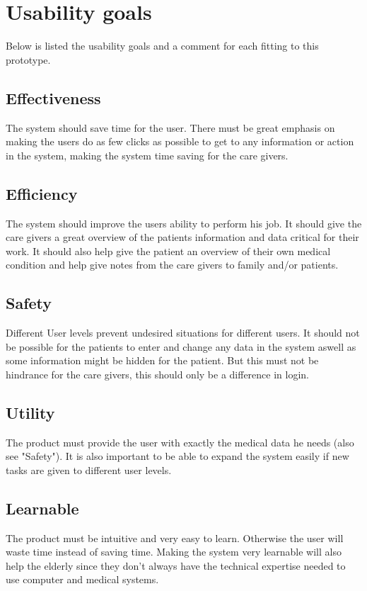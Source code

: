 \section{Usability goals}
Below is listed the usability goals and a comment for each fitting to this prototype.
\subsection{Effectiveness}
The system should save time for the user. There must be great emphasis on making the users do as few clicks as possible to get to any information or action in the system, making the system time saving for the care givers.

\subsection{Efficiency}
The system should improve the users ability to perform his job. It should give the care givers a great overview of the patients information and data critical for their work. It should also help give the patient an overview of their own medical condition and help give notes from the care givers to family and/or patients.

\subsection{Safety}
Different User levels prevent undesired situations for different users. It should not be possible for the patients to enter and change any data in the system aswell as some information might be hidden for the patient. But this must not be hindrance for the care givers, this should only be a difference in login.

\subsection{Utility}
The product must provide the user with exactly the medical data he needs (also see "Safety"). It is also important to be able to expand the system easily if new tasks are given to different user levels.

\subsection{Learnable}
The product must be intuitive and very easy to learn. Otherwise the user will waste time instead of saving time. Making the system very learnable will also help the elderly since they don't always have the technical expertise needed to use computer and medical systems.

